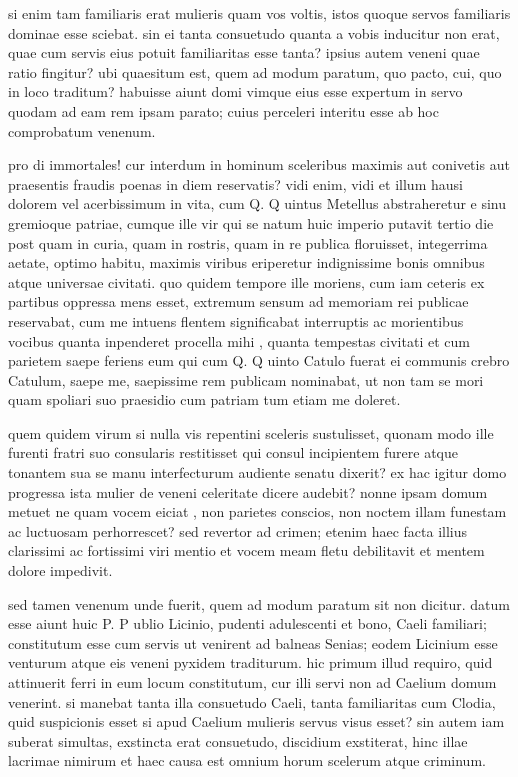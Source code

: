  si enim tam familiaris erat mulieris quam vos voltis, istos quoque servos familiaris dominae esse sciebat. sin ei tanta consuetudo quanta a vobis inducitur non erat, quae cum servis eius potuit familiaritas esse tanta? ipsius autem veneni quae ratio fingitur? ubi quaesitum est, quem ad modum paratum, quo pacto, cui, quo in loco traditum? habuisse aiunt domi vimque eius esse expertum in servo quodam ad eam rem ipsam parato; cuius perceleri interitu esse ab hoc comprobatum venenum.

 pro di immortales! cur interdum in hominum sceleribus maximis aut conivetis aut praesentis fraudis poenas in diem reservatis? vidi enim, vidi et illum hausi dolorem vel acerbissimum in vita, cum Q. Q uintus Metellus abstraheretur e sinu gremioque patriae, cumque ille vir qui se natum huic imperio putavit tertio die post quam in curia, quam in rostris, quam in re publica floruisset, integerrima aetate, optimo habitu, maximis viribus eriperetur indignissime bonis omnibus atque universae civitati. quo quidem tempore ille moriens, cum iam ceteris ex partibus oppressa mens esset, extremum sensum ad memoriam rei publicae reservabat, cum me intuens flentem significabat interruptis ac morientibus vocibus quanta inpenderet procella mihi , quanta tempestas civitati et cum parietem saepe feriens eum qui cum Q. Q uinto Catulo fuerat ei communis crebro Catulum, saepe me, saepissime rem publicam nominabat, ut non tam se mori quam spoliari suo praesidio cum patriam tum etiam me doleret.

 quem quidem virum si nulla vis repentini sceleris sustulisset, quonam modo ille furenti fratri suo consularis restitisset qui consul incipientem furere atque tonantem sua se manu interfecturum audiente senatu dixerit? ex hac igitur domo progressa ista mulier de veneni celeritate dicere audebit? nonne ipsam domum metuet ne quam vocem eiciat , non parietes conscios, non noctem illam funestam ac luctuosam perhorrescet? sed revertor ad crimen; etenim haec facta illius clarissimi ac fortissimi viri mentio et vocem meam fletu debilitavit et mentem dolore impedivit.

 sed tamen venenum unde fuerit, quem ad modum paratum sit non dicitur. datum esse aiunt huic P. P ublio Licinio, pudenti adulescenti et bono, Caeli familiari; constitutum esse cum servis ut venirent ad balneas Senias; eodem Licinium esse venturum atque eis veneni pyxidem traditurum. hic primum illud requiro, quid attinuerit ferri in eum locum constitutum, cur illi servi non ad Caelium domum venerint. si manebat tanta illa consuetudo Caeli, tanta familiaritas cum Clodia, quid suspicionis esset si apud Caelium mulieris servus visus esset? sin autem iam suberat simultas, exstincta erat consuetudo, discidium exstiterat, hinc illae lacrimae nimirum et haec causa est omnium horum scelerum atque criminum.

